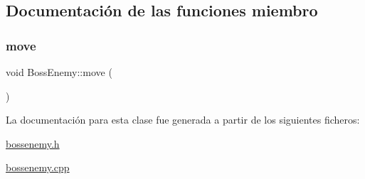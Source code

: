 \subsection{Documentación de las funciones miembro}
\hypertarget{class_boss_enemy_a25a9f61fe3b4770b72a9dccb7685f2e9}{}\label{class_boss_enemy_a25a9f61fe3b4770b72a9dccb7685f2e9} 
\subsubsection{\texorpdfstring{move}{move}}
{\footnotesize\ttfamily void Boss\+Enemy\+::move (\begin{DoxyParamCaption}{ }\end{DoxyParamCaption})\hspace{0.3cm}{\ttfamily [slot]}}



La documentación para esta clase fue generada a partir de los siguientes ficheros\+:\begin{DoxyCompactItemize}
\item 
\hyperlink{bossenemy_8h}{bossenemy.\+h}\item 
\hyperlink{bossenemy_8cpp}{bossenemy.\+cpp}\end{DoxyCompactItemize}
